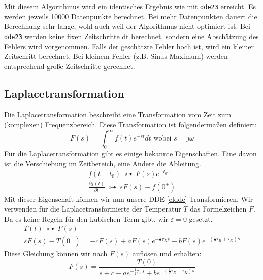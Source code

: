 Mit diesem Algorithmus wird ein identisches Ergebnis wie mit \texttt{dde23} erreicht. 
Es werden jeweils 10000 Datenpunkte berechnet. 
Bei mehr Datenpunkten dauert die Berechnung sehr lange, wohl auch weil der Algorithmus nicht optimiert ist.
Bei \texttt{dde23} werden keine fixen Zeitschritte dt berechnet, sondern eine Abschätzung des Fehlers wird vorgenommen.
Falls der geschätzte Fehler hoch ist, wird ein kleiner Zeitschritt berechnet. 
Bei kleinem Fehler (z.B. Sinus-Maximum) werden entsprechend große Zeitschritte gerechnet. %


\subsection{Laplacetransformation}
Die Laplacetransformation beschreibt eine Transformation vom Zeit zum (komplexen) Frequenzbereich.
Diese Transformation ist folgendermaßen definiert:
\begin{equation}
	F(s)=\int_{0}^{\infty}f(t)e^{-st}dt \text{ wobei } s=j\omega
\end{equation} 
Für die Laplacetransformation gibt es einige bekannte Eigenschaften. 
Eine davon ist die Verschiebung im Zeitbereich, eine Andere die Ableitung.
\begin{align}
	f(t-t_0)\: \multimapdotbothA \: F(s)e^{-t_0 s}\\
	\frac{\partial f(t)}{\partial t}\: \multimapdotbothA \: sF(s)-f(0^+)
\end{align}
Mit dieser Eigenschaft können wir nun unsere DDE \eqref{eldde} Transformieren.
Wir verwenden für die Laplacetransformierte der Temperatur $T$ das Formelzeichen $F$.
Da es keine Regeln für den kubischen Term gibt, wir $\varepsilon = 0$ gesetzt.
\begin{align}
	T(t)\: \multimapdotbothA \: F(s)\\
	sF(s)-T(0^+)=-cF(s)+aF(s)e^{-\frac{1}{2}\tau_K s}-bF(s)e^{-(\frac{1}{2}\tau_R + \tau_K) s}
\end{align}
Diese Gleichung können wir nach $F(s)$ auflösen und erhalten:
\begin{equation}
	F(s) = \frac{T(0)}{s+c-ae^{-\frac{1}{2}\tau_K s}+be^{-(\frac{1}{2}\tau_R + \tau_K)s}}
\end{equation}
